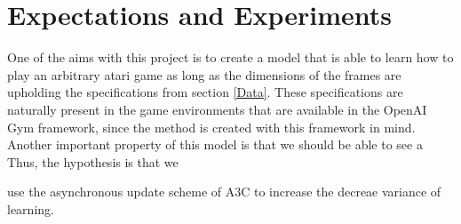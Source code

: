 \documentclass[11pt]{article}
\begin{document}
\maketitle


\section{Expectations and Experiments}

One of the aims with this project is to create a model that is able
to learn how to play an arbitrary atari game as long as the
dimensions of the frames are upholding the specifications from section \ref{Data}.
These specifications are naturally present in the game environments that are available
in the OpenAI Gym framework, since the method is created with this framework in mind.
Another important property of this model is that we should be able to see a 
Thus, the hypothesis is that we 


use the asynchronous update scheme
of A3C to increase the decreae variance of learning.
\end{document}
